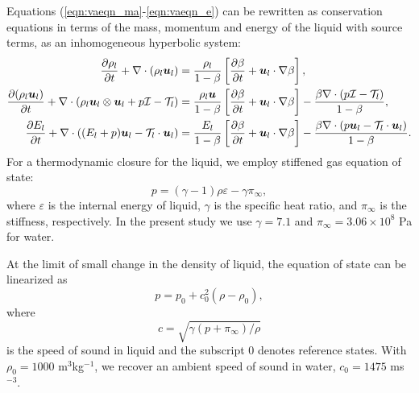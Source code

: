 \documentclass{jfm}
\def\vector#1{\mbox{\boldmath $#1$}}
\def\tensor#1{\mathcal #1}
\begin{document}
Equations
(\ref{eqn:vaeqn_ma}-\ref{eqn:vaeqn_e}) can be rewritten
as conservation equations in terms of the mass, momentum and energy of the liquid
with source terms, as an inhomogeneous hyperbolic system:
\begin{align}
\frac{\partial \rho_l}{\partial t} + \nabla\cdot (\rho_l
\vector{u}_l)
&=\frac{\rho_l}{1-\beta}\left[\frac{\partial
\beta}{\partial t}+\vector{u}_l\cdot\nabla\beta\right],\label{eqn:vaeqn2_ma}\\
\frac{\partial (\rho_l\vector{u}_l)}{\partial t} +
\nabla\cdot (\rho_l\vector{u}_l\otimes \vector{u}_l+p\tensor{I}-\tensor{T}_l)
&=\frac{\rho_l\vector{u}}{1-\beta}\left[\frac{\partial
\beta}{\partial
t}+\vector{u}_l\cdot\nabla\beta\right]
-\frac{\beta\nabla\cdot(p\tensor{I}-\tensor{T}_l)}{1-\beta},\label{eqn:vaeqn2_mo}\\
\frac{\partial E_l}{\partial t} + \nabla\cdot
\left((E_l+p)\vector{u}_l-\tensor{T}_l\cdot\vector{u}_l\right)
&=\frac{E_l}{1-\beta}\left[\frac{\partial
\beta}{\partial
t}+\vector{u}_l\cdot\nabla\beta\right]
-\frac{\beta\nabla\cdot(p\vector{u}_l-\tensor{T}_l\cdot\vector{u}_l)}{1-\beta}.
\label{eqn:vaeqn2_e}
\end{align}
For a thermodynamic closure for the liquid, we employ stiffened gas equation of state:
\begin{equation}
p=(\gamma-1)\rho\varepsilon-\gamma\pi_\infty,
\label{eqn:stiff_gas}
\end{equation}
where $\varepsilon$ is the internal energy of liquid, $\gamma$ is the specific
heat ratio, and $\pi_\infty$ is the stiffness, respectively.
In the present study we use $\gamma=7.1$ and $\pi_\infty=3.06 \times 10^8$ Pa for water.

At the limit of small change in the density of liquid, the equation of state can
be linearized as
\begin{equation}
p=p_0+c_0^2(\rho-\rho_0)
\label{eqn:lin_eqs},
\end{equation}
where
\begin{equation}
c=\sqrt{\gamma(p+\pi_\infty)/\rho}
\label{eqn:c}
\end{equation}
is the speed of sound in liquid and the subscript 0 denotes reference states.
With $\rho_0=1000$ m$^3$kg$^{-1}$, we recover an ambient speed of sound in water, $c_0=1475$ ms$^{-3}$.
\end{document}
